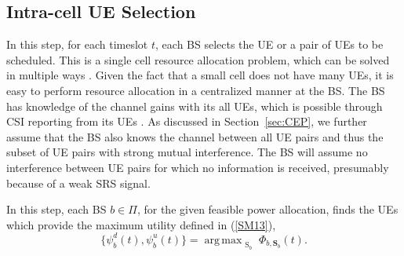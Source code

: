 \documentclass[journal]{IEEEtran}
\DeclareMathOperator*{\argmax}{arg\,max}
\begin{document}
\subsection{Intra-cell UE Selection}\label{sec:DSS1}
In this step, for each timeslot $t$, each BS selects the UE or a pair of UEs to be scheduled. This is a single cell resource allocation problem, which can be solved in multiple ways \cite{DiINFOCOM, Shaocommletter,GMSingleCell}. Given the fact that a small cell does not have many UEs, it is easy to perform resource allocation in a centralized manner at the BS. The BS has knowledge of the channel gains with its all UEs, which is possible through CSI reporting from its UEs \cite{DahlmanLTE}\cite{3GPP:5}. As discussed in Section~\ref{sec:CEP}, we further assume that the BS also knows the channel between all UE pairs and thus the subset of UE pairs with strong mutual interference. The BS will assume no interference between UE pairs for which no information is received, presumably because of a weak SRS signal. 


In this step, each BS $b \in \Pi$, for the given feasible power allocation, finds the UEs which provide the maximum utility defined in (\ref{SM13}),
\begin{equation}\label{DS1}
	\{\psi_b^d(t), \psi_b^u(t) \} =\argmax_{\substack{{\mathrm{S}}_b}}  \Phi_{b,\boldsymbol{\text{S}}_b}(t).
\end{equation} 
\end{document}
